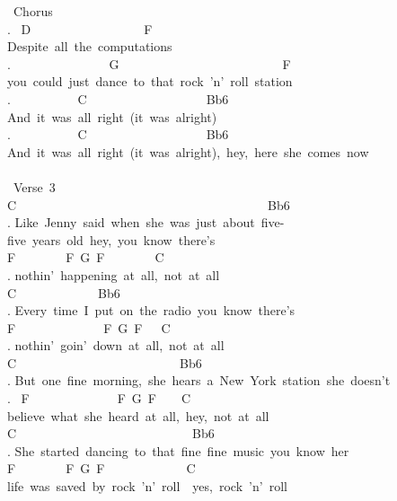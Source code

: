 {\lbrack\ Chorus\rbrack\\
. \ D\ \ \ \ \ \ \ \ \ \ \ \ \ \ \ \ \ \ F\\
Despite\ all\ the\ computations\\
. \ \ \ \ \ \ \ \ \ \ \ \ \ \ \ G\ \ \ \ \ \ \ \ \ \ \ \ \ \ \ \ \ \ \ \ \ \ \ \ \ \ F\\
you\ could\ just\ dance\ to\ that\ rock\ 'n'\ roll\ station\\
. \ \ \ \ \ \ \ \ \ \ C\ \ \ \ \ \ \ \ \ \ \ \ \ \ \ \ \ \ \ Bb6\\
And\ it\ was\ all\ right\ (it\ was\ alright)\\
. \ \ \ \ \ \ \ \ \ \ C\ \ \ \ \ \ \ \ \ \ \ \ \ \ \ \ \ \ \ Bb6\\
And\ it\ was\ all\ right\ (it\ was\ alright),\ hey,\ here\ she\ comes\ now\\
\\
\lbrack\ Verse\ 3\rbrack\\
C\ \ \ \ \ \ \ \ \ \ \ \ \ \ \ \ \ \ \ \ \ \ \ \ \ \ \ \ \ \ \ \ \ \ \ \ \ \ \ \ Bb6\\
. Like\ Jenny\ said\ when\ she\ was\ just\ about\ five-five\ years\ old\ hey,\ you\ know\ there's\\
F\ \ \ \ \ \ \ \ F\ G\ F\ \ \ \ \ \ \ \ C\\
. nothin'\ happening\ at\ all,\ not\ at\ all\\
C\ \ \ \ \ \ \ \ \ \ \ \ \ Bb6\\
. Every\ time\ I\ put\ on\ the\ radio\ you\ know\ there's\\
F\ \ \ \ \ \ \ \ \ \ \ \ \ \ F\ G\ F\ \ \ C\\
. nothin'\ goin'\ down\ at\ all,\ not\ at\ all\\
C\ \ \ \ \ \ \ \ \ \ \ \ \ \ \ \ \ \ \ \ \ \ \ \ \ \ Bb6\\
. But\ one\ fine\ morning,\ she\ hears\ a\ New\ York\ station\ she\ doesn't\\
. \ F\ \ \ \ \ \ \ \ \ \ \ \ \ \ F\ G\ F\ \ \ \ C\\
believe\ what\ she\ heard\ at\ all,\ hey,\ not\ at\ all\\
C\ \ \ \ \ \ \ \ \ \ \ \ \ \ \ \ \ \ \ \ \ \ \ \ \ \ \ \ Bb6\\
. She\ started\ dancing\ to\ that\ fine\ fine\ music\ you\ know\ her\\
F\ \ \ \ \ \ \ \ F\ G\ F\ \ \ \ \ \ \ \ \ \ \ \ \ C\\
life\ was\ saved\ by\ rock\ 'n'\ roll\ \ yes,\ rock\ 'n'\ roll\\
\\
}
